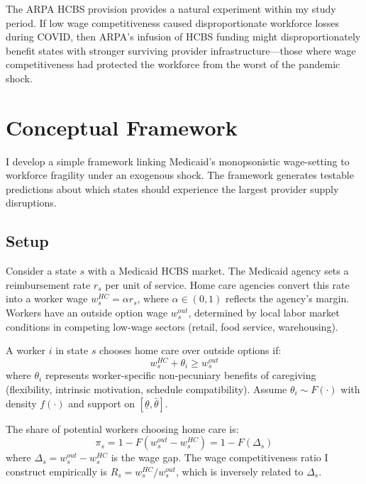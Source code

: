 \documentclass[12pt]{article}
\begin{document}
The ARPA HCBS provision provides a natural experiment within my study period. If low wage competitiveness caused disproportionate workforce losses during COVID, then ARPA's infusion of HCBS funding might disproportionately benefit states with stronger surviving provider infrastructure---those where wage competitiveness had protected the workforce from the worst of the pandemic shock.


\section{Conceptual Framework}

I develop a simple framework linking Medicaid's monopsonistic wage-setting to workforce fragility under an exogenous shock. The framework generates testable predictions about which states should experience the largest provider supply disruptions.

\subsection{Setup}

Consider a state $s$ with a Medicaid HCBS market. The Medicaid agency sets a reimbursement rate $r_s$ per unit of service. Home care agencies convert this rate into a worker wage $w_s^{HC} = \alpha r_s$, where $\alpha \in (0,1)$ reflects the agency's margin. Workers have an outside option wage $w_s^{out}$, determined by local labor market conditions in competing low-wage sectors (retail, food service, warehousing).

A worker $i$ in state $s$ chooses home care over outside options if:
\begin{equation}
w_s^{HC} + \theta_i \geq w_s^{out}
\end{equation}
where $\theta_i$ represents worker-specific non-pecuniary benefits of caregiving (flexibility, intrinsic motivation, schedule compatibility). Assume $\theta_i \sim F(\cdot)$ with density $f(\cdot)$ and support on $[\underline{\theta}, \bar{\theta}]$.

The share of potential workers choosing home care is:
\begin{equation}
\pi_s = 1 - F(w_s^{out} - w_s^{HC}) = 1 - F(\Delta_s)
\end{equation}
where $\Delta_s = w_s^{out} - w_s^{HC}$ is the wage gap. The wage competitiveness ratio I construct empirically is $R_s = w_s^{HC} / w_s^{out}$, which is inversely related to $\Delta_s$.
\end{document}
